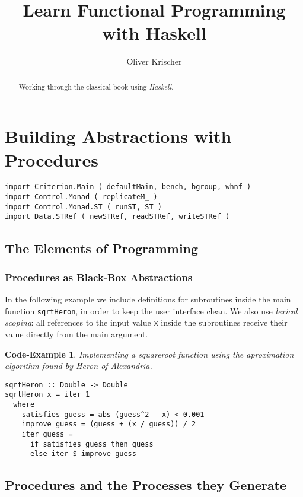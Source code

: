 \documentclass{scrartcl}
\newtheorem{impl}[defn]{Code-Example}
\numberwithin{equation}{section}
\begin{document}
\title{Learn Functional Programming with Haskell}
\author{Oliver Krischer}
\maketitle
\begin{abstract}
  Working through the classical book  \autocite{sicp96} using \emph{Haskell}.
\end{abstract}
\tableofcontents
\listoffigures

\section{Building Abstractions with Procedures}
\begin{verbatim}
import Criterion.Main ( defaultMain, bench, bgroup, whnf )
import Control.Monad ( replicateM_ )
import Control.Monad.ST ( runST, ST )
import Data.STRef ( newSTRef, readSTRef, writeSTRef )
\end{verbatim}

\subsection{The Elements of Programming}
\subsubsection{Procedures as Black-Box Abstractions}

In the following example we include definitions for subroutines inside the main function \texttt{sqrtHeron}, in order to keep the user interface clean.
We also use \emph{lexical scoping}: all references to the input value \texttt{x} inside the subroutines receive their value directly from the main argument.

\begin{impl}
Implementing a squareroot function using the aproximation algorithm found by Heron of Alexandria.
\end{impl}

\begin{verbatim}
sqrtHeron :: Double -> Double 
sqrtHeron x = iter 1
  where 
    satisfies guess = abs (guess^2 - x) < 0.001
    improve guess = (guess + (x / guess)) / 2
    iter guess =
      if satisfies guess then guess
      else iter $ improve guess
\end{verbatim}

\subsection{Procedures and the Processes they Generate}
\end{document}
